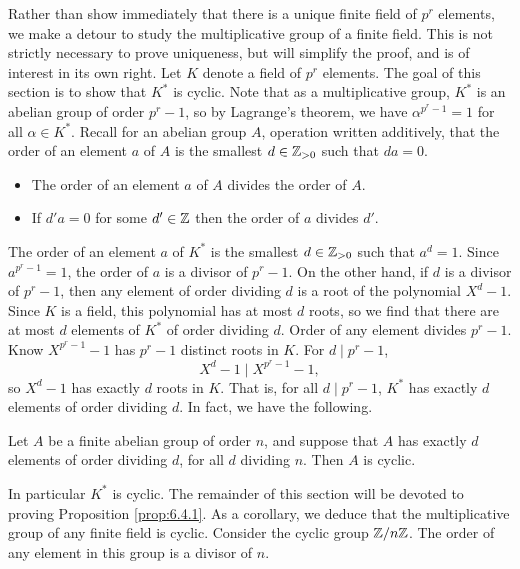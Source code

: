 Rather than show immediately that there is a unique finite field of $ p^r $ elements, we make a detour to study the multiplicative group of a finite field. This is not strictly necessary to prove uniqueness, but will simplify the proof, and is of interest in its own right. Let $ K $ denote a field of $ p^r $ elements. The goal of this section is to show that $ K^* $ is cyclic. Note that as a multiplicative group, $ K^* $ is an abelian group of order $ p^r - 1 $, so by Lagrange's theorem, we have $ \alpha^{p^r - 1} = 1 $ for all $ \alpha \in K^* $. Recall for an abelian group $ A $, operation written additively, that the order of an element $ a $ of $ A $ is the smallest $ d \in \mathbb{Z}_{> 0} $ such that $ da = 0 $.
\begin{itemize}
\item The order of an element $ a $ of $ A $ divides the order of $ A $.
\item If $ d'a = 0 $ for some $ d' \in \mathbb{Z} $ then the order of $ a $ divides $ d' $.
\end{itemize}
The order of an element $ a $ of $ K^* $ is the smallest $ d \in \mathbb{Z}_{> 0} $ such that $ a^d = 1 $. Since $ a^{p^r - 1} = 1 $, the order of $ a $ is a divisor of $ p^r - 1 $. On the other hand, if $ d $ is a divisor of $ p^r - 1 $, then any element of order dividing $ d $ is a root of the polynomial $ X^d - 1 $. Since $ K $ is a field, this polynomial has at most $ d $ roots, so we find that there are at most $ d $ elements of $ K^* $ of order dividing $ d $. Order of any element divides $ p^r - 1 $. Know $ X^{p^r - 1} - 1 $ has $ p^r - 1 $ distinct roots in $ K $. For $ d \mid p^r - 1 $,
$$ X^d - 1 \mid X^{p^r - 1} - 1, $$
so $ X^d - 1 $ has exactly $ d $ roots in $ K $. That is, for all $ d \mid p^r - 1 $, $ K^* $ has exactly $ d $ elements of order dividing $ d $. In fact, we have the following.

\begin{proposition}
\label{prop:6.4.1}
Let $ A $ be a finite abelian group of order $ n $, and suppose that $ A $ has exactly $ d $ elements of order dividing $ d $, for all $ d $ dividing $ n $. Then $ A $ is cyclic.
\end{proposition}

In particular $ K^* $ is cyclic. The remainder of this section will be devoted to proving Proposition \ref{prop:6.4.1}. As a corollary, we deduce that the multiplicative group of any finite field is cyclic. Consider the cyclic group $ \mathbb{Z} / n\mathbb{Z} $. The order of any element in this group is a divisor of $ n $.


